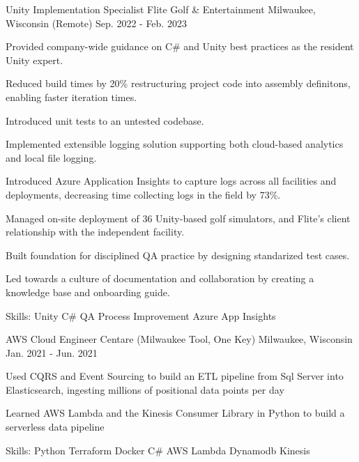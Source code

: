 \begin{cventries}
  \cventry
    {Unity Implementation Specialist} %
    {Flite Golf \& Entertainment} %
    {Milwaukee, Wisconsin (Remote)} %
    {Sep. 2022 - Feb. 2023} %
    {
      \begin{cvitems} %
        \item {Provided company-wide guidance on C\# and Unity best practices as the resident Unity expert.}
        \item {Reduced build times by 20\% restructuring project code into assembly definitons, enabling faster iteration times.}
        \item {Introduced unit tests to an untested codebase.}
        \item {Implemented extensible logging solution supporting both cloud-based analytics and local file logging.}
        \item {Introduced Azure Application Insights to capture logs across all facilities and deployments, decreasing time collecting logs in the field by 73\%.}
        \item {Managed on-site deployment of 36 Unity-based golf simulators, and Flite's client relationship with the independent facility.}
        \item {Built foundation for disciplined QA practice by designing standarized test cases.}
        \item {Led towards a culture of documentation and collaboration by creating a knowledge base and onboarding guide.}
        \item {Skills: Unity \textbullet{} C\# \textbullet{} QA Process Improvement \textbullet{} Azure App Insights}
      \end{cvitems}
    }

  \cventry
    {AWS Cloud Engineer} %
    {Centare (Milwaukee Tool, One Key)} %
    {Milwaukee, Wisconsin} %
    {Jan. 2021 - Jun. 2021} %
    {
      \begin{cvitems} %
        \item {Used CQRS and Event Sourcing to build an ETL pipeline from Sql Server into Elasticsearch, ingesting millions of positional data points per day }
        \item {Learned AWS Lambda and the Kinesis Consumer Library in Python to build a serverless data pipeline}
        \item {Skills: Python \textbullet{} Terraform \textbullet{} Docker \textbullet{} C\# \textbullet{} AWS Lambda \textbullet{} Dynamodb \textbullet{} Kinesis}
      \end{cvitems}
    }


\end{cventries}
